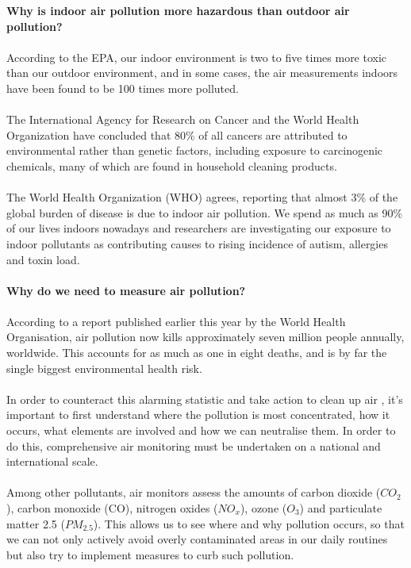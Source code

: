 \textbf{Why is indoor air pollution more hazardous than outdoor air pollution?}
\\
\\
According to the EPA, our indoor environment is two to five times more toxic than our outdoor environment, and in some cases, the air measurements indoors have been found to be 100 times more polluted.
\\
\\
The International Agency for Research on Cancer and the World Health Organization have concluded that 80\% of all cancers are attributed to environmental rather than genetic factors, including exposure to carcinogenic chemicals, many of which are found in household cleaning products.
\\
\\
The World Health Organization (WHO) agrees, reporting that almost 3\% of the global burden of disease is due to indoor air pollution. We spend as much as 90\% of our lives indoors nowadays and researchers are investigating our exposure to indoor pollutants as contributing causes to rising incidence of autism, allergies and toxin load.
\\
\\
\textbf{Why do we need to measure air pollution?}
\\
\\
According to a report published earlier this year by the World Health Organisation, air pollution now kills approximately seven million people annually, worldwide. This accounts for as much as one in eight deaths, and is by far the single biggest environmental health risk.
\\
\\
In order to counteract this alarming statistic and take action to clean up air , it’s important to first understand where the pollution is most concentrated, how it occurs, what elements are involved and how we can neutralise them. In order to do this, comprehensive air monitoring must be undertaken on a national and international scale.
\\
\\
Among other pollutants, air monitors assess the amounts of carbon dioxide ($CO_2$), carbon monoxide (CO), nitrogen oxides ($NO_x$), ozone ($O_3$) and particulate matter 2.5 ($PM_2.5$). This allows us to see where and why pollution occurs, so that we can not only actively avoid overly contaminated areas in our daily routines but also try to implement measures to curb such pollution.

